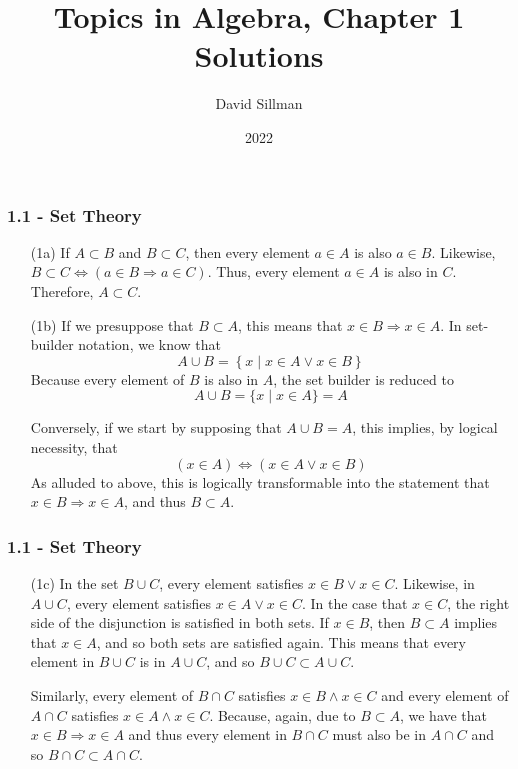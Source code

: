 \documentclass{beamer}
\title{Topics in Algebra, Chapter 1 Solutions}
\author{David Sillman}
\date{2022}
\begin{document}
\frame{\titlepage}

\begin{frame}
\frametitle{1.1 - Set Theory}
\small
\begin{enumerate}
    \item [(1a)]
    If $A\subset B$ and $B\subset C$, then every element $a\in A$ is also $a\in B$. Likewise, $B\subset C \Leftrightarrow \left(a\in B \Rightarrow a\in C\right)$. Thus, every element $a\in A$ is also in $C$. Therefore, $A\subset C$.
    \item [(1b)]
    If we presuppose that $B\subset A$, this means that $x\in B \Rightarrow x\in A$. In set-builder notation, we know that \begin{equation*}
        A\cup B = \left\{ x \mid x\in A \vee x\in B \right\}
    \end{equation*} 
    Because every element of $B$ is also in $A$, the set builder is reduced to 
    \begin{equation*}
        A\cup B = \{x\mid x\in A \} = A
    \end{equation*}

    Conversely, if we start by supposing that $A\cup B = A$, this implies, by logical necessity, that
    \begin{equation*}
        (x\in A) \Leftrightarrow (x\in A \vee x\in B)
    \end{equation*}
    As alluded to above, this is logically transformable into the statement that $x\in B \Rightarrow x\in A$, and thus $B\subset A$.
\end{enumerate}
\end{frame}
\begin{frame}
\frametitle{1.1 - Set Theory}
\small
\begin{enumerate}
    \item [(1c)] \quad In the set $B \cup C$, every element satisfies $x\in B \vee x\in C$. Likewise, in $A \cup C$, every element satisfies $x\in A \vee x\in C$. In the case that $x\in C$, the right side of the disjunction is satisfied in both sets. If $x\in B$, then $B\subset A$ implies that $x\in A$, and so both sets are satisfied again. This means that every element in $B\cup C$ is in $A\cup C$, and so $B\cup C \subset A\cup C$.
    
    \quad Similarly, every element of $B\cap C$ satisfies $x\in B \wedge x\in C$ and every element of $A\cap C$ satisfies $x\in A \wedge x\in C$. Because, again, due to $B\subset A$, we have that $x\in B \Rightarrow x\in A$ and thus every element in $B\cap C$ must also be in $A\cap C$ and so $B\cap C \subset A \cap C$.
\end{enumerate}
\end{frame}
\end{document}
